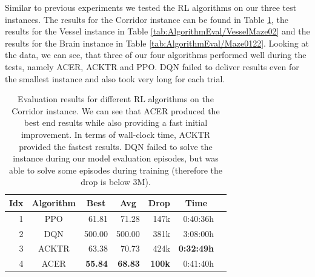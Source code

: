 Similar to previous experiments we tested the RL algorithms on our three test instances. The results for the Corridor instance can be found in Table \ref{tab:AlgorithmEval/Maze0318}, the results for the Vessel instance in Table \ref{tab:AlgorithmEval/VesselMaze02} and the results for the Brain instance in Table \ref{tab:AlgorithmEval/Maze0122}. Looking at the data, we can see, that three of our four algorithms performed well during the tests, namely ACER, ACKTR and PPO. DQN failed to deliver results even for the smallest instance and also took very long for each trial.

\begin{table}[htp]
    \begin{center}
        \begin{tabular}{rcrrrrr}
            \toprule
            \multicolumn{1}{c}{Idx} & \multicolumn{1}{c}{Algorithm} & \multicolumn{1}{c}{Best} & \multicolumn{1}{c}{Avg} & \multicolumn{1}{c}{Drop} & \multicolumn{1}{c}{Time}\\
            \midrule
            1 & PPO & 61.81 & 71.28 & 147k & 0:40:36h \\
            2 & DQN & 500.00 & 500.00 & 381k & 3:08:00h \\
            3 & ACKTR & 63.38 & 70.73 & 424k & \textbf{0:32:49h} \\
            4 & ACER & \textbf{55.84} & \textbf{68.83} & \textbf{100k} & 0:41:40h \\
            \bottomrule
        \end{tabular}
    \end{center}
    \caption[Evaluation of RL Algorithms on the Corridor Instance]{Evaluation results for different RL algorithms on the Corridor instance. We can see that ACER produced the best end results while also providing a fast initial improvement. In terms of wall-clock time, ACKTR provided the fastest results. DQN failed to solve the instance during our model evaluation episodes, but was able to solve some episodes during training (therefore the drop is below 3M).} \label{tab:AlgorithmEval/Maze0318}
\end{table}

